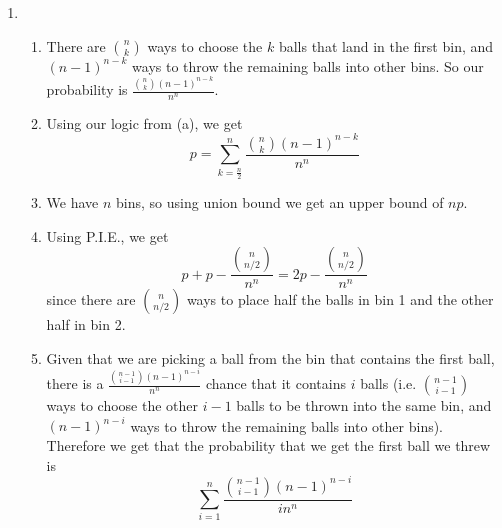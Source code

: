 \begin{enumerate}
    \item \begin{enumerate}
        \item There are $\binom{n}{k}$ ways to choose the $k$ balls that land in the first bin, and $(n-1)^{n-k}$ ways to throw the remaining balls into other bins. So our probability is $\frac{\binom{n}{k}(n-1)^{n-k}}{n^n}$.
        
        \item Using our logic from (a), we get
        \[
        p = \sum\limits_{k = \frac{n}{2}}^n \frac{\binom{n}{k}(n-1)^{n-k}}{n^n}
        \]
        
        \item We have $n$ bins, so using union bound we get an upper bound of $np$.
        
        \item Using P.I.E., we get
        \[
        p + p - \frac{\binom{n}{n/2}}{n^n} = 2p - \frac{\binom{n}{n/2}}{n^n}
        \]
        since there are $\binom{n}{n/2}$ ways to place half the balls in bin 1 and the other half in bin 2.
        
        \item Given that we are picking a ball from the bin that contains the first ball, there is a $\frac{\binom{n-1}{i-1}(n-1)^{n-i}}{n^n}$ chance that it contains $i$ balls (i.e. $\binom{n-1}{i-1}$ ways to choose the other $i-1$ balls to be thrown into the same bin, and $(n-1)^{n-i}$ ways to throw the remaining balls into other bins). Therefore we get that the probability that we get the first ball we threw is
        \[
        \sum\limits_{i = 1}^n \frac{\binom{n-1}{i-1}(n-1)^{n-i}}{in^n}
        \]
    \end{enumerate}
\end{enumerate}
